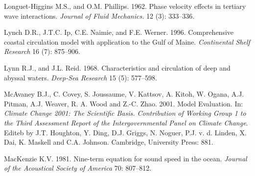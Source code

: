 \begin{thebibliography}{999}
Longuet-Higgins M.S., and O.M. Phillips.  1962. Phase velocity effects
in tertiary wave interactions. \textit{Journal of Fluid Mechanics.} 12
(3): 333--336.
%

Lynch D.R., J.T.C. Ip, C.E. Naimie, and
F.E. Werner. 1996. Comprehensive coastal circulation model with
application to the Gulf of Maine.  \textit{Continental Shelf Research}
16 (7): 875--906.
%

Lynn R.J., and J.L. Reid.  1968. Characteristics and circulation of
deep and abyssal waters. \textit{Deep-Sea Research} 15 (5): 577--598.
%

McAvaney B.J., C. Covey, S. Joussaume, V. Kattsov, A. Kitoh, W. Ogana,
A.J. Pitman, A.J. Weaver, R. A. Wood and Z.-C. Zhao. 2001. Model
Evaluation. In: \textit{Climate Change 2001: The Scientific
  Basis. Contribution of Working Group 1 to the Third Assessment
  Report of the Intergovernmental Panel on Climate Change}.  Editeb by
J.T. Houghton, Y. Ding, D.J. Griggs, N. Noguer, P.J. v. d. Linden, X.
Dai, K. Maskell and C.A. Johnson. Cambridge, University Press: 881.
%

MacKenzie K.V.  1981. Nine-term equation for sound speed in the ocean.
\textit{Journal of the Acoustical Society of America} 70: 807--812.
%


\end{thebibliography}
